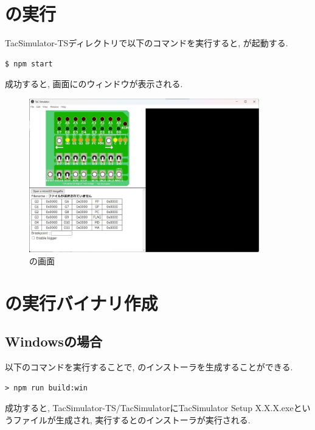 \section{\tacsim の実行}

TacSimulator-TSディレクトリで以下のコマンドを実行すると, \tacsim が起動する.

\begin{mylist}
\begin{verbatim}
$ npm start
\end{verbatim}
\end{mylist}

成功すると, 画面に\tacsim のウィンドウが表示される.

\begin{figure}[H]
    \centering
    \includegraphics[width=10cm]{"figs/chapter2-tacsimulator.jpg"}
    \caption{\tacsim の画面} \label{fig:ch2-tacsim}
\end{figure}

\section{\tacsim の実行バイナリ作成}

\subsection{Windowsの場合}

以下のコマンドを実行することで, \tacsim のインストーラを生成することができる.

\begin{mylist}
\begin{verbatim}
> npm run build:win
\end{verbatim}
\end{mylist}

成功すると, TacSimulator-TS/TacSimulatorにTacSimulator Setup X.X.X.exeというファイルが生成され, 実行すると\tacsim のインストーラが実行される.

